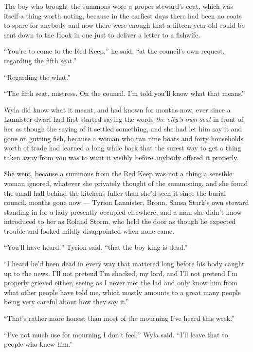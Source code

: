 The boy who brought the summons wore a proper steward’s coat, which was itself a thing worth noting, because in the earliest days there had been no coats to spare for anybody and now there were enough that a fifteen-year-old could be sent down to the Hook in one just to deliver a letter to a fishwife.

“You’re to come to the Red Keep,” he said, “at the council’s own request, regarding the fifth seat.”

“Regarding the what.”

“The fifth seat, mistress. On the council. I’m told you’ll know what that means.”

Wyla did know what it meant, and had known for months now, ever since a Lannister dwarf had first started saying the words \textit{the city’s own seat} in front of her as though the saying of it settled something, and she had let him say it and gone on gutting fish, because a woman who ran nine boats and forty households worth of trade had learned a long while back that the surest way to get a thing taken away from you was to want it visibly before anybody offered it properly.

\sceneBreak

She went, because a summons from the Red Keep was not a thing a sensible woman ignored, whatever she privately thought of the summoning, and she found the small hall behind the kitchens fuller than she’d seen it since the burial council, months gone now — Tyrion Lannister, Bronn, Sansa Stark’s own steward standing in for a lady presently occupied elsewhere, and a man she didn’t know introduced to her as Roland Storm, who held the door as though he expected trouble and looked mildly disappointed when none came.

“You’ll have heard,” Tyrion said, “that the boy king is dead.”

“I heard he’d been dead in every way that mattered long before his body caught up to the news. I’ll not pretend I’m shocked, my lord, and I’ll not pretend I’m properly grieved either, seeing as I never met the lad and only know him from what other people have told me, which mostly amounts to a great many people being very careful about how they say it.”

“That’s rather more honest than most of the mourning I’ve heard this week.”

“I’ve not much use for mourning I don’t feel,” Wyla said. “I’ll leave that to people who knew him.”

\sceneBreak

